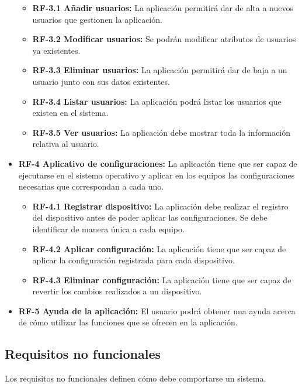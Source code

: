 \begin{itemize}
	\begin{itemize}
		\tightlist
		\item \textbf{RF-3.1 Añadir usuarios:} La aplicación permitirá dar de alta a nuevos usuarios que gestionen la aplicación.
		\item \textbf{RF-3.2 Modificar usuarios:} Se podrán modificar atributos de usuarios ya existentes.
		\item \textbf{RF-3.3 Eliminar usuarios:} La aplicación permitirá dar de baja a un usuario junto con sus datos existentes.
		\item \textbf{RF-3.4 Listar usuarios:} La aplicación podrá listar los usuarios que existen en el sistema.
		\item \textbf{RF-3.5 Ver usuarios:} La aplicación debe mostrar toda la información relativa al usuario.
	\end{itemize}
	\item \textbf{RF-4 Aplicativo de configuraciones:} La aplicación tiene que ser capaz de ejecutarse en el sistema operativo y aplicar en los equipos las configuraciones necesarias que correspondan a cada uno.
	\begin{itemize}
		\tightlist
		\item \textbf{RF-4.1 Registrar dispositivo:} La aplicación debe realizar el registro del dispositivo antes de poder aplicar las configuraciones.
		Se debe identificar de manera única a cada equipo.
		\item \textbf{RF-4.2 Aplicar configuración:} La aplicación tiene que ser capaz de aplicar la configuración registrada para cada dispositivo.
		\item \textbf{RF-4.3 Eliminar configuración:} La aplicación tiene que ser capaz de revertir los cambios realizados a un dispositivo.
	\end{itemize}
	\item 	\textbf{RF-5 Ayuda de la aplicación:} El usuario podrá obtener una ayuda acerca de cómo utilizar las funciones que se ofrecen en la aplicación.
\end{itemize}


\subsection{Requisitos no funcionales}\label{subsec:requisitos-no-funcionales}

Los requisitos no funcionales definen cómo debe comportarse un sistema.

